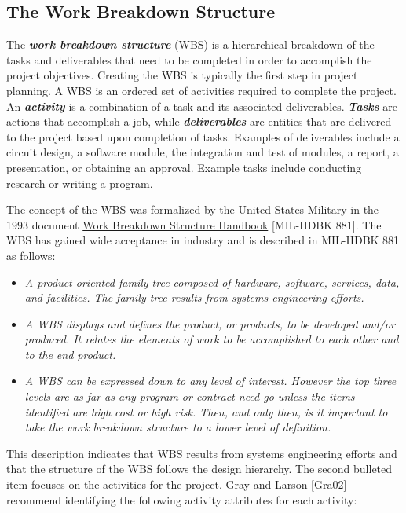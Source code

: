 \subsection{The Work Breakdown
Structure}\label{the-work-breakdown-structure}

The \emph{\textbf{work breakdown structure}} (WBS) is a hierarchical
breakdown of the tasks and deliverables that need to be completed in
order to accomplish the project objectives. Creating the WBS is
typically the first step in project planning. A WBS is an ordered set of
activities required to complete the project. An \emph{\textbf{activity}}
is a combination of a task and its associated deliverables.
\emph{\textbf{Tasks}} are actions that accomplish a job, while
\emph{\textbf{deliverables}} are entities that are delivered to the
project based upon completion of tasks. Examples of deliverables include
a circuit design, a software module, the integration and test of
modules, a report, a presentation, or obtaining an approval. Example
tasks include conducting research or writing a program.

The concept of the WBS was formalized by the United States Military in
the 1993 document \ul{Work Breakdown Structure Handbook} {[}MIL-HDBK
881{]}. The WBS has gained wide acceptance in industry and is described
in MIL-HDBK 881 as follows:

\begin{itemize}
\item
  \emph{A product-oriented family tree composed of hardware, software,
  services, data, and facilities. The family tree results from systems
  engineering efforts.}
\item
  \emph{A WBS displays and defines the product, or products, to be
  developed and/or produced. It relates the elements of work to be
  accomplished to each other and to the end product.}
\item
  \emph{A WBS can be expressed down to any level of interest. However
  the top three levels are as far as any program or contract need go
  unless the items identified are high cost or high risk. Then, and only
  then, is it important to take the work breakdown structure to a lower
  level of definition.}
\end{itemize}

This description indicates that WBS results from systems engineering
efforts and that the structure of the WBS follows the design hierarchy.
The second bulleted item focuses on the activities for the project. Gray
and Larson {[}Gra02{]} recommend identifying the following activity
attributes for each activity:

